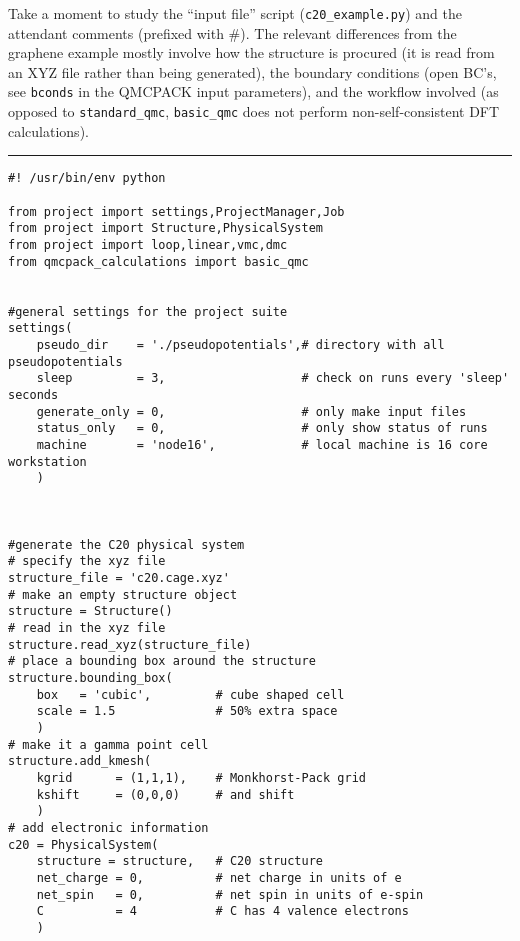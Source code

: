 \documentclass[oneside,11pt]{memoir}
\numberwithin{equation}{section}
\newcommand{\HRule}{\rule{\linewidth}{0.5mm}}
\begin{document}
Take a moment to study the ``input file'' script 
(\texttt{c20\_example.py}) and the attendant comments 
(prefixed with \#). The relevant differences from the graphene example
mostly involve how the structure is procured (it is read from an XYZ file
rather than being generated), the boundary conditions (open BC's, see 
\texttt{bconds} in the QMCPACK input parameters), and the workflow involved 
(as opposed to \texttt{standard\_qmc}, \texttt{basic\_qmc} does not perform 
non-self-consistent DFT calculations).


\HRule
\begin{verbatim}
#! /usr/bin/env python

from project import settings,ProjectManager,Job
from project import Structure,PhysicalSystem
from project import loop,linear,vmc,dmc
from qmcpack_calculations import basic_qmc


#general settings for the project suite
settings(
    pseudo_dir    = './pseudopotentials',# directory with all pseudopotentials
    sleep         = 3,                   # check on runs every 'sleep' seconds
    generate_only = 0,                   # only make input files
    status_only   = 0,                   # only show status of runs
    machine       = 'node16',            # local machine is 16 core workstation
    )



#generate the C20 physical system
# specify the xyz file
structure_file = 'c20.cage.xyz'
# make an empty structure object
structure = Structure()
# read in the xyz file
structure.read_xyz(structure_file)
# place a bounding box around the structure
structure.bounding_box(
    box   = 'cubic',         # cube shaped cell
    scale = 1.5              # 50% extra space
    )
# make it a gamma point cell
structure.add_kmesh(
    kgrid      = (1,1,1),    # Monkhorst-Pack grid
    kshift     = (0,0,0)     # and shift
    )
# add electronic information
c20 = PhysicalSystem(
    structure = structure,   # C20 structure
    net_charge = 0,          # net charge in units of e
    net_spin   = 0,          # net spin in units of e-spin
    C          = 4           # C has 4 valence electrons
    ) 



\end{verbatim}
\end{document}
